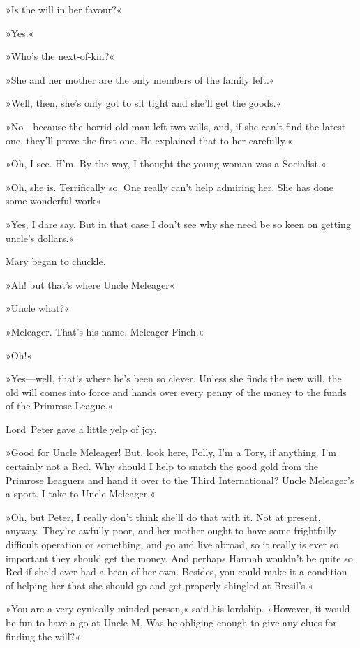 »Is the will in her favour?«

»Yes.«

»Who's the next-of-kin?«

»She and her mother are the only members of the family left.«

»Well, then, she's only got to sit tight and she'll get the goods.«

»No—because the horrid old man left two wills, and, if she can't find the latest one, they'll prove the first one. He explained that to her carefully.«

»Oh, I see. H'm. By the way, I thought the young woman was a Socialist.«

»Oh, she is. Terrifically so. One really can't help admiring her. She has done some wonderful work\longdash«

»Yes, I dare say. But in that case I don't see why she need be so keen on getting uncle's dollars.«

Mary began to chuckle.

»Ah! but that's where Uncle Meleager\longdash«

»Uncle what?«

»Meleager. That's his name. Meleager Finch.«

»Oh!«

»Yes—well, that's where he's been so clever. Unless she finds the new will, the old will comes into force and hands over every penny of the money to the funds of the Primrose League.«

Lord~Peter gave a little yelp of joy.

»Good for Uncle Meleager! But, look here, Polly, I'm a Tory, if anything. I'm certainly not a Red. Why should I help to snatch the good gold from the Primrose Leaguers and hand it over to the Third International? Uncle Meleager's a sport. I take to Uncle Meleager.«

»Oh, but Peter, I really don't think she'll do that with it. Not at present, anyway. They're awfully poor, and her mother ought to have some frightfully difficult operation or something, and go and live abroad, so it really is ever so important they should get the money. And perhaps Hannah wouldn't be quite so Red if she'd ever had a bean of her own. Besides, you could make it a condition of helping her that she should go and get properly shingled at Bresil's.«

»You are a very cynically-minded person,« said his lordship. »However, it would be fun to have a go at Uncle M\@. Was he obliging enough to give any clues for finding the will?«

